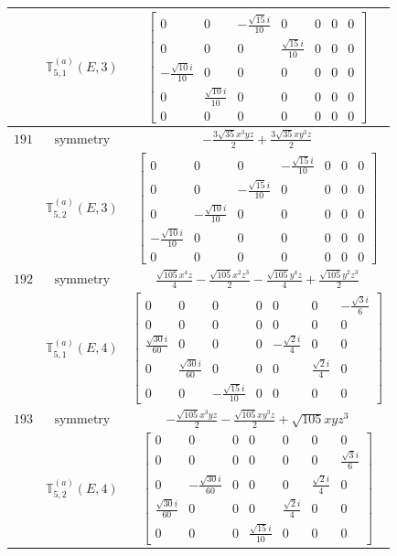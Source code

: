 \documentclass[fleqn,8pt,landscape]{jsarticle}
\begin{document}
\begin{longtable}{ccc}
$  $ & $ \mathbb{T}_{5,1}^{(a)}(E,3) $ & $ \begin{bmatrix} 0 & 0 & - \frac{\sqrt{15} i}{10} & 0 & 0 & 0 & 0 \\ 0 & 0 & 0 & \frac{\sqrt{15} i}{10} & 0 & 0 & 0 \\ - \frac{\sqrt{10} i}{10} & 0 & 0 & 0 & 0 & 0 & 0 \\ 0 & \frac{\sqrt{10} i}{10} & 0 & 0 & 0 & 0 & 0 \\ 0 & 0 & 0 & 0 & 0 & 0 & 0 \end{bmatrix} $ \\ \hline
$ 191 $ & $ \text{symmetry} $ & $ - \frac{3 \sqrt{35} x^{3} y z}{2} + \frac{3 \sqrt{35} x y^{3} z}{2} $ \\
$  $ & $ \mathbb{T}_{5,2}^{(a)}(E,3) $ & $ \begin{bmatrix} 0 & 0 & 0 & - \frac{\sqrt{15} i}{10} & 0 & 0 & 0 \\ 0 & 0 & - \frac{\sqrt{15} i}{10} & 0 & 0 & 0 & 0 \\ 0 & - \frac{\sqrt{10} i}{10} & 0 & 0 & 0 & 0 & 0 \\ - \frac{\sqrt{10} i}{10} & 0 & 0 & 0 & 0 & 0 & 0 \\ 0 & 0 & 0 & 0 & 0 & 0 & 0 \end{bmatrix} $ \\ \hline
$ 192 $ & $ \text{symmetry} $ & $ \frac{\sqrt{105} x^{4} z}{4} - \frac{\sqrt{105} x^{2} z^{3}}{2} - \frac{\sqrt{105} y^{4} z}{4} + \frac{\sqrt{105} y^{2} z^{3}}{2} $ \\
$  $ & $ \mathbb{T}_{5,1}^{(a)}(E,4) $ & $ \begin{bmatrix} 0 & 0 & 0 & 0 & 0 & 0 & - \frac{\sqrt{3} i}{6} \\ 0 & 0 & 0 & 0 & 0 & 0 & 0 \\ \frac{\sqrt{30} i}{60} & 0 & 0 & 0 & - \frac{\sqrt{2} i}{4} & 0 & 0 \\ 0 & \frac{\sqrt{30} i}{60} & 0 & 0 & 0 & \frac{\sqrt{2} i}{4} & 0 \\ 0 & 0 & - \frac{\sqrt{15} i}{10} & 0 & 0 & 0 & 0 \end{bmatrix} $ \\ \hline
$ 193 $ & $ \text{symmetry} $ & $ - \frac{\sqrt{105} x^{3} y z}{2} - \frac{\sqrt{105} x y^{3} z}{2} + \sqrt{105} x y z^{3} $ \\
$  $ & $ \mathbb{T}_{5,2}^{(a)}(E,4) $ & $ \begin{bmatrix} 0 & 0 & 0 & 0 & 0 & 0 & 0 \\ 0 & 0 & 0 & 0 & 0 & 0 & \frac{\sqrt{3} i}{6} \\ 0 & - \frac{\sqrt{30} i}{60} & 0 & 0 & 0 & \frac{\sqrt{2} i}{4} & 0 \\ \frac{\sqrt{30} i}{60} & 0 & 0 & 0 & \frac{\sqrt{2} i}{4} & 0 & 0 \\ 0 & 0 & 0 & \frac{\sqrt{15} i}{10} & 0 & 0 & 0 \end{bmatrix} $ \\ \hline

\end{longtable}
\end{document}
